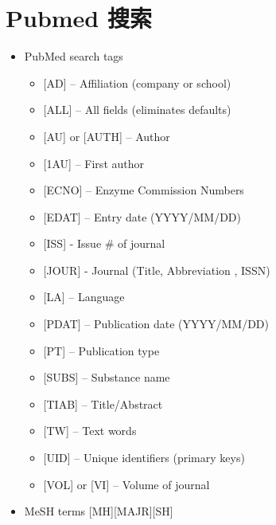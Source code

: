 \documentclass[]{book}
\providecommand{\tightlist}{%
  \setlength{\itemsep}{0pt}\setlength{\parskip}{0pt}}
\begin{document}
\hypertarget{pubmed-ux641cux7d22}{%
\section{Pubmed 搜索}\label{pubmed-ux641cux7d22}}

\begin{itemize}
\tightlist
\item
  PubMed search tags

  \begin{itemize}
  \tightlist
  \item
    {[}AD{]} -- Affiliation (company or school)
  \item
    {[}ALL{]} -- All fields (eliminates defaults)
  \item
    {[}AU{]} or {[}AUTH{]} -- Author
  \item
    {[}1AU{]} -- First author
  \item
    {[}ECNO{]} -- Enzyme Commission Numbers
  \item
    {[}EDAT{]} -- Entry date (YYYY/MM/DD)
  \item
    {[}ISS{]} - Issue \# of journal
  \item
    {[}JOUR{]} - Journal (Title, Abbreviation , ISSN)
  \item
    {[}LA{]} -- Language
  \item
    {[}PDAT{]} -- Publication date (YYYY/MM/DD)
  \item
    {[}PT{]} -- Publication type
  \item
    {[}SUBS{]} -- Substance name
  \item
    {[}TIAB{]} -- Title/Abstract
  \item
    {[}TW{]} -- Text words
  \item
    {[}UID{]} -- Unique identifiers (primary keys)
  \item
    {[}VOL{]} or {[}VI{]} -- Volume of journal
  \end{itemize}
\item
  MeSH terms {[}MH{]}{[}MAJR{]}{[}SH{]}


\end{itemize}
\end{document}
